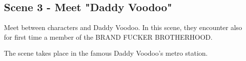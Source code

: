 \subsection{Scene 3 - Meet "Daddy Voodoo"}

\begin{scene_summary}
Meet between characters and Daddy Voodoo. In this scene, they encounter also for first time a member of the  BRAND FUCKER BROTHERHOOD.
\end{scene_summary}

\begin{location_description}
The scene takes place in the famous Daddy Voodoo's metro station. 
\end{location_description}


